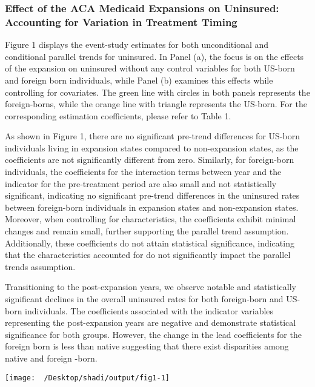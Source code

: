 \documentclass[
]{article}
\begin{document}
\hypertarget{effect-of-the-aca-medicaid-expansions-on-uninsured-accounting-for-variation-in-treatment-timing}{%
\subsubsection{Effect of the ACA Medicaid Expansions on Uninsured:
Accounting for Variation in Treatment
Timing}\label{effect-of-the-aca-medicaid-expansions-on-uninsured-accounting-for-variation-in-treatment-timing}}

Figure 1 displays the event-study estimates for both unconditional and
conditional parallel trends for uninsured. In Panel (a), the focus is on
the effects of the expansion on uninsured without any control variables
for both US-born and foreign born individuals, while Panel (b) examines
this effects while controlling for covariates. The green line with
circles in both panels represents the foreign-borns, while the orange
line with triangle represents the US-born. For the corresponding
estimation coefficients, please refer to Table 1.

As shown in Figure 1, there are no significant pre-trend differences for
US-born individuals living in expansion states compared to non-expansion
states, as the coefficients are not significantly different from zero.
Similarly, for foreign-born individuals, the coefficients for the
interaction terms between year and the indicator for the pre-treatment
period are also small and not statistically significant, indicating no
significant pre-trend differences in the uninsured rates between
foreign-born individuals in expansion states and non-expansion states.
Moreover, when controlling for characteristics, the coefficients exhibit
minimal changes and remain small, further supporting the parallel trend
assumption. Additionally, these coefficients do not attain statistical
significance, indicating that the characteristics accounted for do not
significantly impact the parallel trends assumption.

Transitioning to the post-expansion years, we observe notable and
statistically significant declines in the overall uninsured rates for
both foreign-born and US-born individuals. The coefficients associated
with the indicator variables representing the post-expansion years are
negative and demonstrate statistical significance for both groups.
However, the change in the lead coefficients for the foreign born is
less than native suggesting that there exist disparities among native
and foreign -born.

\begin{center}\texttt{[image: ~/Desktop/shadi/output/fig1-1]} \end{center}
\end{document}
